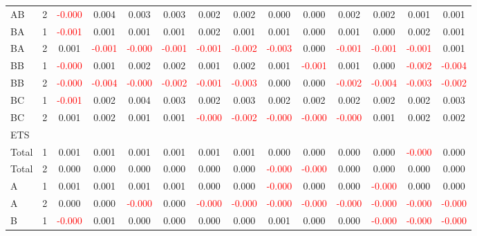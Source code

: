 \begin{table}[!htb]
{\begin{tabular}{llcccccccccccc}
AB & 2 & \textcolor{red}{-0.000} & 0.004 & 0.003 & 0.003 & 0.002 & 0.002 & 0.000 & 0.000 & 0.002 & 0.002 & 0.001 & 0.001\\
BA & 1 & \textcolor{red}{-0.001} & 0.001 & 0.001 & 0.001 & 0.002 & 0.001 & 0.001 & 0.000 & 0.001 & 0.000 & 0.002 & 0.001\\
BA & 2 & 0.001 & \textcolor{red}{-0.001} & \textcolor{red}{-0.000} & \textcolor{red}{-0.001} & \textcolor{red}{-0.001} & \textcolor{red}{-0.002} & \textcolor{red}{-0.003} & 0.000 & \textcolor{red}{-0.001} & \textcolor{red}{-0.001} & \textcolor{red}{-0.001} & 0.001\\
BB & 1 & \textcolor{red}{-0.000} & 0.001 & 0.002 & 0.002 & 0.001 & 0.002 & 0.001 & \textcolor{red}{-0.001} & 0.001 & 0.000 & \textcolor{red}{-0.002} & \textcolor{red}{-0.004}\\
BB & 2 & \textcolor{red}{-0.000} & \textcolor{red}{-0.004} & \textcolor{red}{-0.000} & \textcolor{red}{-0.002} & \textcolor{red}{-0.001} & \textcolor{red}{-0.003} & 0.000 & 0.000 & \textcolor{red}{-0.002} & \textcolor{red}{-0.004} & \textcolor{red}{-0.003} & \textcolor{red}{-0.002}\\
BC & 1 & \textcolor{red}{-0.001} & 0.002 & 0.004 & 0.003 & 0.002 & 0.003 & 0.002 & 0.002 & 0.002 & 0.002 & 0.002 & 0.003\\
BC & 2 & 0.001 & 0.002 & 0.001 & 0.001 & \textcolor{red}{-0.000} & \textcolor{red}{-0.002} & \textcolor{red}{-0.000} & \textcolor{red}{-0.000} & \textcolor{red}{-0.000} & 0.001 & 0.002 & 0.002\\
\hline
ETS &  &  &  &  &  &  &  &  &  &  &  &  & \\
\hline
Total & 1 & 0.001 & 0.001 & 0.001 & 0.001 & 0.001 & 0.001 & 0.000 & 0.000 & 0.000 & 0.000 & \textcolor{red}{-0.000} & 0.000\\
Total & 2 & 0.000 & 0.000 & 0.000 & 0.000 & 0.000 & 0.000 & \textcolor{red}{-0.000} & \textcolor{red}{-0.000} & 0.000 & 0.000 & 0.000 & 0.000\\
A & 1 & 0.001 & 0.001 & 0.001 & 0.001 & 0.000 & 0.000 & \textcolor{red}{-0.000} & 0.000 & 0.000 & \textcolor{red}{-0.000} & 0.000 & 0.000\\
A & 2 & 0.000 & 0.000 & \textcolor{red}{-0.000} & 0.000 & \textcolor{red}{-0.000} & \textcolor{red}{-0.000} & \textcolor{red}{-0.000} & \textcolor{red}{-0.000} & \textcolor{red}{-0.000} & \textcolor{red}{-0.000} & \textcolor{red}{-0.000} & \textcolor{red}{-0.000}\\
B & 1 & \textcolor{red}{-0.000} & 0.001 & 0.000 & 0.000 & 0.000 & 0.000 & 0.001 & 0.000 & 0.000 & \textcolor{red}{-0.000} & \textcolor{red}{-0.000} & \textcolor{red}{-0.000}\\

\end{tabular}}
\end{table}
